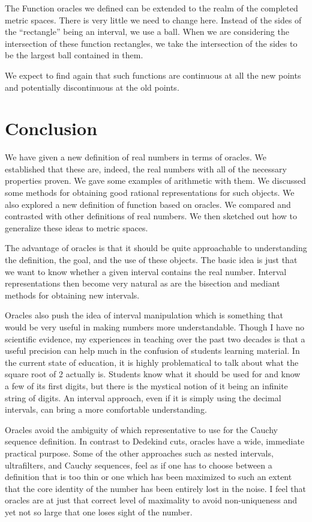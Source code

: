 \documentclass[12pt]{article}
\theoremstyle{remark}
\begin{document}
The Function oracles we defined can be extended to the realm of the completed metric spaces. There is very little we need to change here. Instead of the sides of the ``rectangle'' being an interval, we use a ball. When we are considering the intersection of these function rectangles, we take the intersection of the sides to be the largest ball contained in them. 

We expect to find again that such functions are continuous at all the new points and potentially discontinuous at the old points. 

\section{Conclusion}

We have given a new definition of real numbers in terms of oracles. We established that these are, indeed, the real numbers with all of the necessary properties proven. We gave some examples of arithmetic with them. We discussed some methods for obtaining good rational representations for such objects. We also explored a new definition of function based on oracles. We compared and contrasted with other definitions of real numbers. We then sketched out how to generalize these ideas to metric spaces. 

The advantage of oracles is that it should be quite approachable to understanding the definition, the goal, and the use of these objects. The basic idea is just that we want to know whether a given interval contains the real number. Interval representations then become very natural as are the bisection and mediant methods for obtaining new intervals. 

Oracles also push the idea of interval manipulation which is something that would be very useful in making numbers more understandable. Though I have no scientific evidence, my experiences in teaching over the past two decades is that a useful precision can help much in the confusion of students learning material. In the current state of education, it is highly problematical to talk about what the square root of 2 actually is. Students know what it should be used for and know a few of its first digits, but there is the mystical notion of it being an infinite string of digits. An interval approach, even if it is simply using the decimal intervals, can bring a more comfortable understanding. 

Oracles avoid the ambiguity of which representative to use for the Cauchy sequence definition. In contrast to Dedekind cuts, oracles have a wide, immediate practical purpose. Some of the other approaches such as nested intervals, ultrafilters, and Cauchy sequences, feel as if one has to choose between a definition that is too thin or one which has been maximized to such an extent that the core identity of the number has been entirely lost in the noise. I feel that oracles are at just that correct level of maximality to avoid non-uniqueness and yet not so large that one loses sight of the number. 
\end{document}
